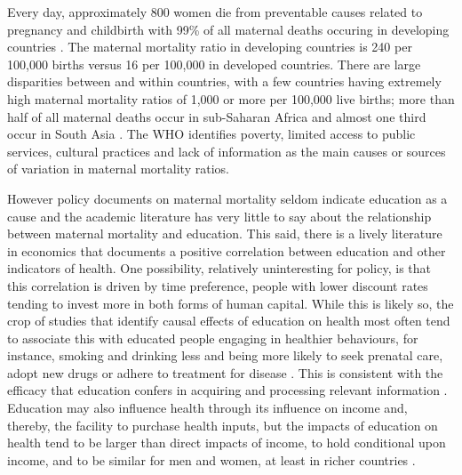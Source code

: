 \documentclass{article}[12pt,subeqn]
\begin{document}
\begin{spacing}{1.4}
Every day, approximately 800 women die from preventable causes related to 
pregnancy and childbirth with 99\% of all maternal deaths occuring in
developing countries \citep{WHO2012}. The maternal mortality ratio in developing
countries is 240 per 100,000 births versus 16 per 100,000 in developed countries.
There are large disparities between and within countries, with a few countries
having extremely high maternal mortality ratios of 1,000 or more per 100,000 live
births; more than half of all maternal deaths occur in sub-Saharan Africa and
almost one third occur in South Asia \citep{WHO2012}. The WHO identifies poverty,
limited access to public services, cultural practices and lack of information as
the main causes or sources of variation in maternal mortality ratios. 

However policy documents on maternal mortality seldom indicate education as a 
cause and the academic literature has very little to say about the relationship 
between maternal mortality and education. This said,
there is a lively literature in economics that documents a positive correlation 
between education and other indicators of health. One possibility, relatively 
uninteresting for policy, is that this correlation is driven by time preference, 
people with lower discount rates tending to invest more in both forms of human 
capital.  While this is likely so, the crop of studies that identify causal 
effects of education on health most often tend to associate this with educated 
people engaging in healthier behaviours, for instance, smoking and drinking
less and being more likely to seek prenatal care, adopt new drugs or adhere to 
treatment for disease \citep{GoldmanSmith2010, GoldmanLakdawalla2001, 
CurrieMoretti2003, LichtenburgLlerasMuney2005, CutlerLlerasMuney2010,
GliedLlerasMuney2010, JensenLlerasMuney2012}. This is consistent with the 
efficacy that education confers in acquiring and processing relevant information 
\citep{Rosenzweig1995, RosenzweigSchultz1989, CutlerLlerasMuney2010}. Education 
may also influence health through its influence on income and, thereby, the 
facility to purchase health inputs, but the impacts of education on health tend to 
be larger than direct impacts of income, to hold conditional upon income, and to 
be similar for men and women, at least in richer countries \citep{LlerasMuney2005, 
CutlerLlerasMuney2010}.


\end{spacing}
\end{document}
